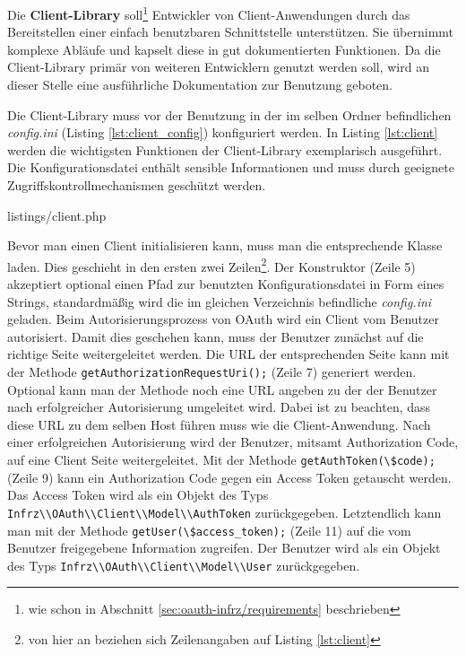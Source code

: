 \documentclass[12pt,a4paper,pointednumbers,abstracton]{scrartcl}
\newcommand{\code}[1]{\small\lstinline[style=InlinePHP]!#1!\normalsize}
\begin{document}
Die \textbf{Client-Library} soll\footnote{wie schon in Abschnitt \ref{sec:oauth-infrz/requirements} beschrieben} Entwickler von Client-Anwendungen durch das Bereitstellen einer einfach benutzbaren Schnittstelle unterstützen.
Sie übernimmt komplexe Abläufe und kapselt diese in gut dokumentierten Funktionen.
Da die Client-Library primär von weiteren Entwicklern genutzt werden soll, wird an dieser Stelle eine ausführliche Dokumentation zur Benutzung geboten.

Die Client-Library muss vor der Benutzung in der im selben Ordner befindlichen \emph{config.ini} (Listing \ref{lst:client_config}) konfiguriert werden.
In Listing \ref{lst:client} werden die wichtigsten Funktionen der Client-Library exemplarisch ausgeführt.
Die Konfigurationsdatei enthält sensible Informationen und muss durch geeignete Zugriffskontrollmechanismen geschützt werden.

\begin{minipage}{\textwidth}
	
	{listings/client.php}
\end{minipage}

Bevor man einen Client initialisieren kann, muss man die entsprechende Klasse laden.
Dies geschieht in den ersten zwei Zeilen\footnote{von hier an beziehen sich Zeilenangaben auf Listing \ref{lst:client}}.
Der Konstruktor (Zeile 5) akzeptiert optional einen Pfad zur benutzten Konfigurationsdatei in Form eines Strings, standardmäßig wird die im gleichen Verzeichnis befindliche \emph{config.ini} geladen.
Beim Autorisierungsprozess von OAuth wird ein Client vom Benutzer autorisiert.
Damit dies geschehen kann, muss der Benutzer zunächst auf die richtige Seite weitergeleitet werden.
Die URL der entsprechenden Seite kann mit der Methode \code{getAuthorizationRequestUri();} (Zeile 7) generiert werden.
Optional kann man der Methode noch eine URL angeben zu der der Benutzer nach erfolgreicher Autorisierung umgeleitet wird.
Dabei ist zu beachten, dass diese URL zu dem selben Host führen muss wie die Client-Anwendung.
Nach einer erfolgreichen Autorisierung wird der Benutzer, mitsamt Authorization Code, auf eine Client Seite weitergeleitet.
Mit der Methode \code{getAuthToken(\$code);} (Zeile 9) kann ein Authorization Code gegen ein Access Token getauscht werden.
Das Access Token wird als ein Objekt des Typs \code{Infrz\\OAuth\\Client\\Model\\AuthToken} zurückgegeben.
Letztendlich kann man mit der Methode \code{getUser(\$access_token);} (Zeile 11) auf die vom Benutzer freigegebene Information zugreifen.
Der Benutzer wird als ein Objekt des Typs \code{Infrz\\OAuth\\Client\\Model\\User} zurückgegeben.
\end{document}
